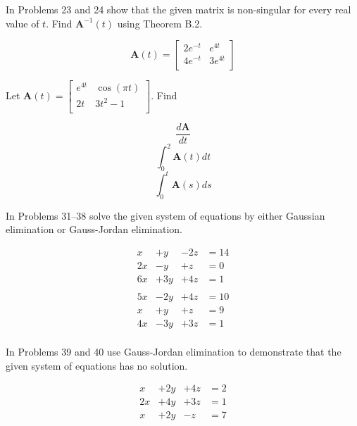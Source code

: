 \documentclass[chapter=2,section=1]{math252homework}
\begin{document}
In Problems 23 and 24 show that the given matrix is non-singular for every real value of $t$.
Find $\mathbf{A}^{-1}(t)$ using Theorem B.2.
\begin{problems}[start=23]
	\problem \[ \mathbf{A}(t) = \left[ \begin{array}{cc}
		2e^{-t} & e^{4t}\\
		4e^{-t} & 3e^{4t}\\
	\end{array} \right] \]						%
\end{problems}

\begin{problems}[start=29]
	\problem Let $\mathbf{A}(t) = \left[ \begin{array}{cc}
		e^{4t} & \cos(\pi t)\\
		2t & 3t^{2} - 1\\
	\end{array} \right]$.
	Find
	\begin{problems}
		\subproblem \[ \frac{d\mathbf{A}}{dt} \]						%
		\subproblem \[ \int_{0}^{2} \mathbf{A}(t)dt \]					%
		\subproblem \[ \int_{0}^{t} \mathbf{A}(s)ds \]					%
	\end{problems}
\end{problems}

In Problems 31--38 solve the given system of equations by either Gaussian elimination or Gauss-Jordan elimination.
\begin{problems}[start=31]
	\problem \begin{equation*}
	\begin{aligned}
		 x &+  y &- 2z &= 14\\
		2x &-  y &+  z &= 0\\
		6x &+ 3y &+ 4z &= 1\\
	\end{aligned}
	\end{equation*}					%
	\problem \begin{equation*}
	\begin{aligned}
		5x &- 2y &+ 4z &= 10\\
		 x &+  y &+  z &= 9\\
		4x &- 3y &+ 3z &= 1\\
	\end{aligned}
	\end{equation*}					%
\end{problems}

In Problems 39 and 40 use Gauss-Jordan elimination to demonstrate that the given system of equations has no solution.
\begin{problems}[start=39]
	\problem \begin{equation*}
	\begin{aligned}
		 x &+ 2y &+ 4z &= 2\\
		2x &+ 4y &+ 3z &= 1\\
		 x &+ 2y &-  z &= 7\\
	\end{aligned}
	\end{equation*}						%
\end{problems}
\end{document}
